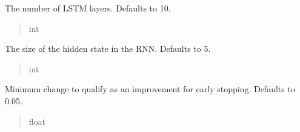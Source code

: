 \documentclass[letterpaper,10pt,english]{sphinxmanual}
\begin{document}
\begin{fulllineitems}
\begin{fulllineitems}
\label{\detokenize{application.algorithms.lstmVae:application.algorithms.lstmVae.LstmVaeConfiguration.LstmVaeConfiguration.lstm_layers}}
\pysigstartsignatures
{}
\pysigstopsignatures
\sphinxAtStartPar
The number of LSTM layers. Defaults to 10.
\begin{quote}\begin{description}
\sphinxAtStartPar
int

\end{description}\end{quote}

\end{fulllineitems}


\begin{fulllineitems}
\label{\detokenize{application.algorithms.lstmVae:application.algorithms.lstmVae.LstmVaeConfiguration.LstmVaeConfiguration.rnn_hidden_size}}
\pysigstartsignatures
{}
\pysigstopsignatures
\sphinxAtStartPar
The size of the hidden state in the RNN. Defaults to 5.
\begin{quote}\begin{description}
\sphinxAtStartPar
int

\end{description}\end{quote}

\end{fulllineitems}


\begin{fulllineitems}
\label{\detokenize{application.algorithms.lstmVae:application.algorithms.lstmVae.LstmVaeConfiguration.LstmVaeConfiguration.early_stopping_delta}}
\pysigstartsignatures
{}
\pysigstopsignatures
\sphinxAtStartPar
Minimum change to qualify as an improvement for early stopping. Defaults to 0.05.
\begin{quote}\begin{description}
\sphinxAtStartPar
float


\end{description}
\end{quote}
\end{fulllineitems}
\end{fulllineitems}
\end{document}
